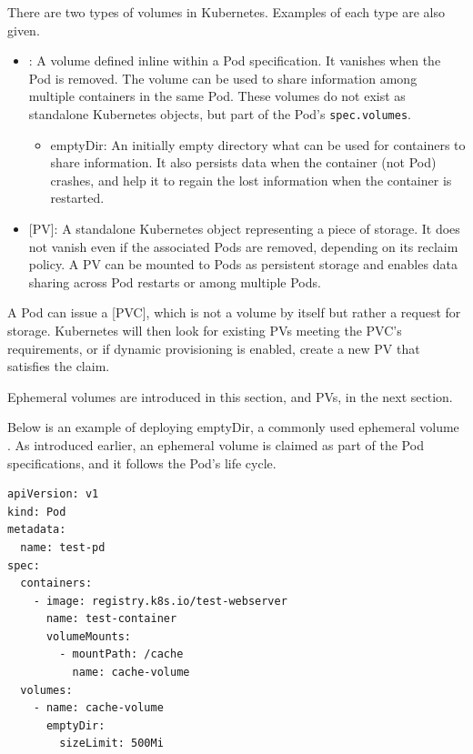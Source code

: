 There are two types of volumes in Kubernetes. Examples of each type are also given.
\begin{itemize}
  \item {}: A volume defined inline within a Pod specification. It vanishes when the Pod is removed. The volume can be used to share information among multiple containers in the same Pod. These volumes do not exist as standalone Kubernetes objects, but part of the Pod's \verb|spec.volumes|.
      \begin{itemize}
        \item emptyDir: An initially empty directory what can be used for containers to share information. It also persists data when the container (not Pod) crashes, and help it to regain the lost information when the container is restarted.
      \end{itemize}
  \item {}[PV]: A standalone Kubernetes object representing a piece of storage. It does not vanish even if the associated Pods are removed, depending on its reclaim policy. A PV can be mounted to Pods as persistent storage and enables data sharing across Pod restarts or among multiple Pods.
\end{itemize}
A Pod can issue a [PVC], which is not a volume by itself but rather a request for storage. Kubernetes will then look for existing PVs meeting the PVC's requirements, or if dynamic provisioning is enabled, create a new PV that satisfies the claim.

Ephemeral volumes are introduced in this section, and PVs, in the next section.

Below is an example of deploying emptyDir, a commonly used ephemeral volume \cite{kubernetes2024volumes}. As introduced earlier, an ephemeral volume is claimed as part of the Pod specifications, and it follows the Pod's life cycle. 
\begin{lstlisting}
apiVersion: v1
kind: Pod
metadata:
  name: test-pd
spec:
  containers:
    - image: registry.k8s.io/test-webserver
      name: test-container
      volumeMounts:
        - mountPath: /cache
          name: cache-volume
  volumes:
    - name: cache-volume
      emptyDir:
        sizeLimit: 500Mi
\end{lstlisting}

